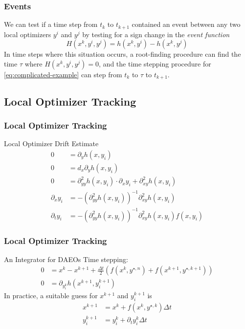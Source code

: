 \documentclass[10pt]{beamer}
\begin{document}
\begin{frame}
	\frametitle{Events}
	We can test if a time step from $t_k$ to $t_{k+1}$ contained an event between any two local optimizers $y^i$ and $y^j$ by testing for a sign change in the \textit{event function}
	\begin{equation}
		H(x^k, y^i, y^j) = h(x^k, y^i) - h(x^k, y^j)
	\end{equation}
	\vfill
	\vfill
	In time steps where this situation occurs, a root-finding procedure can find the time $\tau$ where $H(x^k, y^i, y^j) = 0$, and the time stepping procedure for \eqref{eq:complicated-example} can step from $t_k$ to $\tau$ to $t_{k+1}$.
	\vfill
\end{frame}

\subsection{Local Optimizer Tracking}

\begin{frame}
	\frametitle{Local Optimizer Tracking}
	\begin{block}{Local Optimizer Drift Estimate}
	\begin{equation}
		\label{eq:local-tracking-guess}
		\begin{aligned}
			0&=\partial_{y}h(x, y_i)\\
			0&=d_x\partial_yh(x, y_i)\\
			0&=\partial^2_{yy}h(x, y_i)\cdot\partial_xy_i + \partial^2_{xy}h(x,y_i)\\
			\partial_xy_i &= -\left(\partial^2_{yy}h(x,y_i)\right)^{-1}\partial^2_{xy}h(x, y_i)\\
			\partial_ty_i &= -\left(\partial^2_{yy}h(x,y_i)\right)^{-1}\partial^2_{xy}h(x, y_i)f(x, y_i)
		\end{aligned}
	\end{equation}
	\end{block}
\end{frame}

\begin{frame}
	\frametitle{Local Optimizer Tracking}
	\begin{block}{An Integrator for DAEOs}
			Time stepping:
		\begin{equation}
			\label{eq:integrator-with-tracking}
			\begin{aligned}
				0 &= x^k - x^{k+1} + \frac{\Delta t}{2}\left(f(x^k, 	y^{\star,n})+f(x^{k+1}, y^{\star,k+1})\right)\\
				0 &= \partial_{y^k_i}h\left(x^{k+1}, y^{k+1}_i\right)
			\end{aligned}
		\end{equation}
		In practice, a suitable guess for $x^{k+1}$ and $y_i^{k+1}$ is
		\begin{equation*}
			\begin{aligned}
				x^{k+1} &= x^k + f(x^k, y^{\star, k})\Delta t\\
				y_i^{k+1} &= y_i^k + \partial_ty_i^k \Delta t
			\end{aligned}
		\end{equation*}
	\end{block}
\end{frame}
\end{document}
